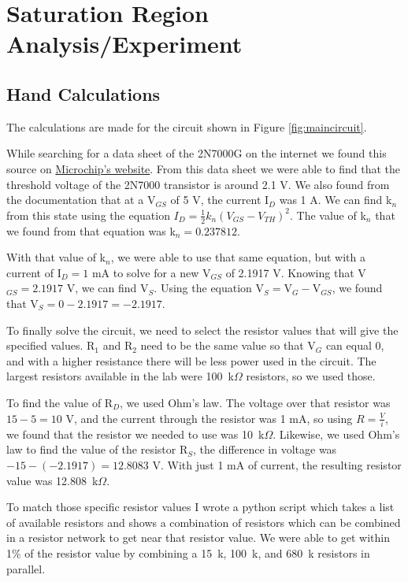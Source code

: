 \documentclass{article}
\begin{document}
\section{Saturation Region Analysis/Experiment}
\subsection{Hand Calculations}
The calculations are made for the circuit shown in 
Figure \ref{fig:maincircuit}.

While searching for a data sheet of the 2N7000G on 
the internet we found this source on
\href{https://ww1.microchip.com/downloads/en/devicedoc/2n7000-n-channel-enhancement-mode-vertical-dmos-fet-data-sheet-20005695a.pdf}{Microchip's website}.
From this data sheet we were able to find that the threshold
voltage of the 2N7000 transistor is around 2.1 V. 
We also found from the documentation that at a V$_{GS}$ of 
5 V, the current I$_D$ was 1 A. We can find k$_n$ from this state
using the equation $I_D=\frac{1}{2}k_n(V_{GS}-V_{TH})^2$. The
value of k$_n$ that we found from that equation was k$_n=0.237812$.

With that value of k$_n$, we were able to use that same equation, but
with a current of I$_D=1$ mA to solve for a new V$_{GS}$ of 
2.1917 V. Knowing that V$_{GS}=2.1917$ V, we can find V$_S$.
Using the equation V$_S=$V$_G-$V$_{GS}$, we found that
V$_S=0-2.1917=-2.1917$.

To finally solve the circuit, we need to select the resistor
values that will give the specified values. R$_1$ and R$_2$ 
need to be the same value so that V$_G$ can equal 0, and 
with a higher resistance there will be less power used in
the circuit. The largest resistors available in the lab were
100~k$\Omega$ resistors, so we used those.

To find the value of R$_D$, we used Ohm's law. The voltage
over that resistor was $15-5=10$ V, and the current through
the resistor was 1 mA, so using $R=\frac{V}{i}$, we found
that the resistor we needed to use was 10~k$\Omega$. Likewise,
we used Ohm's law to find the value of the resistor R$_S$, the
difference in voltage was $-15-(-2.1917)=12.8083$ V. With just
1 mA of current, the resulting resistor value was
12.808~k$\Omega$.

To match those specific resistor values I wrote a python script
which takes a list of available resistors and shows a 
combination of resistors which can be combined in a resistor
network to get near that resistor value. We were able to get
within 1\% of the resistor value by combining a 15~k, 100~k, and
680~k resistors in parallel.
\end{document}
